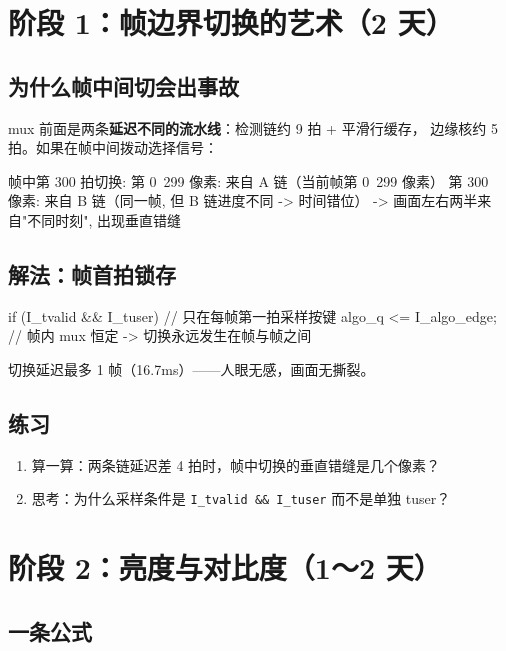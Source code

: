 \documentclass[11pt]{ctexart}
\newcommand{\code}[1]{\texttt{#1}}
\begin{document}
\section{阶段 1：帧边界切换的艺术（2 天）}

\subsection{为什么帧中间切会出事故}

mux 前面是两条\textbf{延迟不同的流水线}：检测链约 9 拍 + 平滑行缓存，
边缘核约 5 拍。如果在帧中间拨动选择信号：

\begin{Verilog}
帧中第 300 拍切换:
  第 0~299 像素: 来自 A 链（当前帧第 0~299 像素）
  第 300~ 像素:  来自 B 链（同一帧, 但 B 链进度不同 -> 时间错位）
  -> 画面左右两半来自"不同时刻", 出现垂直错缝
\end{Verilog}

\subsection{解法：帧首拍锁存}

\begin{Verilog}
if (I_tvalid && I_tuser)      // 只在每帧第一拍采样按键
    algo_q <= I_algo_edge;
// 帧内 mux 恒定 -> 切换永远发生在帧与帧之间
\end{Verilog}

切换延迟最多 1 帧（16.7ms）——人眼无感，画面无撕裂。

\subsection{练习}

\begin{enumerate}
  \item 算一算：两条链延迟差 4 拍时，帧中切换的垂直错缝是几个像素？
  \item 思考：为什么采样条件是 \code{I\_tvalid \&\& I\_tuser} 而不是单独 tuser？
\end{enumerate}

\section{阶段 2：亮度与对比度（1～2 天）}

\subsection{一条公式}
\end{document}
